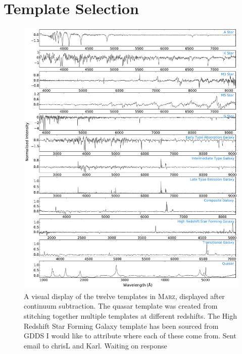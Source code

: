 \documentclass[iop]{emulateapj}
\newcommand{\red}{\color{red}}
\newcommand{\marz}{\textsc{Marz}}
\begin{document}
\section{Template Selection}



\begin{figure}[h]
\centering
\includegraphics[width=\textwidth]{templates.pdf}
\caption{A visual display of the twelve templates in \marz{}, displayed after continuum subtraction. The quasar template was created from stitching together multiple templates at different redshifts. The High Redshift Star Forming Galaxy template has been sourced from GDDS \citet{abraham2004}{\red I would like to attribute where each of these come from. Sent email to chrisL and Karl. Waiting on response}}
\label{fig:templates}
\end{figure}
\end{document}
